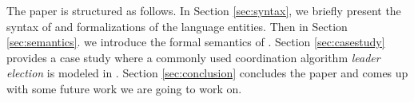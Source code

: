 The paper is structured as follows. In Section \ref{sec:syntax}, we briefly present the syntax of \lang{} and formalizations of the language entities. Then in Section \ref{sec:semantics}. we introduce the formal semantics of \lang{}. Section \ref{sec:casestudy} provides a case study where a commonly used coordination algorithm \emph{leader election} is modeled in \lang{}. Section \ref{sec:conclusion} concludes the paper and comes up with some future work we are going to work on.